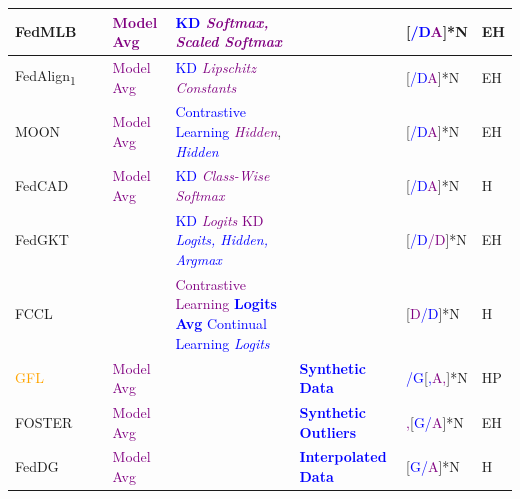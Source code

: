 \begin{table}[htp]
\begin{longtable}{|p{1.68cm}|p{1.2cm}|p{1.25cm}|p{5.0cm}|p{2.59cm}|p{1.2cm}|p{0.35cm}|}
    FedMLB~\cite{kim2022multi} & & \textcolor{purple}{Model Avg} &\textcolor{blue}{KD} \textcolor{purple}{\textit{Softmax, Scaled Softmax}} & & [\textcolor{blue}{/D}\textcolor{purple}{A}]*N & EH \\ \hline %

    FedAlign\textsubscript{1}~\cite{mendieta2022local}& &\textcolor{purple}{Model Avg}&\textcolor{blue}{KD}  \textcolor{purple}{\textit{Lipschitz Constants}}~\cite{shang2021lipschitz}& & [\textcolor{blue}{/D}\textcolor{purple}{A}]*N & EH \\ \hline %
    
    MOON~\cite{li2021model} & & \textcolor{purple}{Model Avg} & \textcolor{blue}{Contrastive Learning} \textcolor{purple}{\textit{Hidden}}, \textcolor{blue}{\textit{Hidden}} &&[\textcolor{blue}{/D}\textcolor{purple}{A}]*N & EH \\ \hline %

    FedCAD~\cite{he2022class} & & \textcolor{purple}{Model Avg} & \textcolor{blue}{KD} \textcolor{purple}{\textit{Class-Wise Softmax}} &&[\textcolor{blue}{/D}\textcolor{purple}{A}]*N & H \\ \hline %

    FedGKT~\cite{he2020group} & & & \textcolor{blue}{KD} \textcolor{purple}{\textit{Logits}} \textcolor{purple}{KD} \textcolor{blue}{\textit{Logits, Hidden, Argmax}} & & [\textcolor{blue}{/D}\textcolor{purple}{/D}]*N & EH \\ \hline

    FCCL~\cite{huang2022learn} & & & \textcolor{purple}{Contrastive Learning} \textcolor{blue}{\textbf{Logits Avg}} \textcolor{blue}{Continual Learning} \textcolor{blue}{\textit{Logits}} & & [\textcolor{purple}{D}\textcolor{blue}{/D}]*N & H \\ \hline %

    \textcolor{orange}{GFL}~\cite{cheng2023gfl} & & \textcolor{purple}{Model Avg} & & \textcolor{blue}{\textbf{Synthetic Data}} & \textcolor{blue}{/G}[\textcolor{blue}{,}\textcolor{purple}{A,}]*N & HP \\ \hline

    FOSTER~\cite{yu2023turning} & & \textcolor{purple}{Model Avg} & & \textcolor{blue}{\textbf{Synthetic Outliers}} & \textcolor{purple}{,}[\textcolor{blue}{G/}\textcolor{purple}{A}]*N & EH \\ \hline

    FedDG~\cite{liu2021feddg} & & \textcolor{purple}{Model Avg} & & \textcolor{blue}{\textbf{Interpolated Data}} & [\textcolor{blue}{G/}\textcolor{purple}{A}]*N & H \\ \hline  %


\end{longtable}
\end{table}
